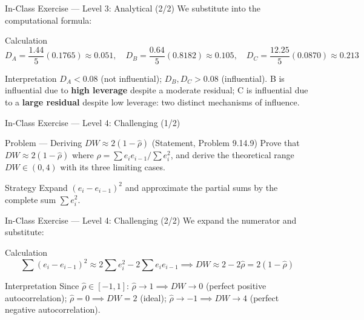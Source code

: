 \documentclass[10pt, aspectratio=169]{beamer}
\begin{document}
\begin{frame}{In-Class Exercise --- Level 3: Analytical (2/2)}
  \scriptsize
  We substitute into the computational formula: \pause

  \vspace{0.05cm}
  \begin{block}{Calculation}
    \scriptsize
    $$D_A=\frac{1.44}{5}(0.1765)\approx0.051, \quad D_B=\frac{0.64}{5}(0.8182)\approx0.105, \quad D_C=\frac{12.25}{5}(0.0870)\approx0.213$$
  \end{block}

  \vspace{0.05cm}
  \pause
  \begin{alertblock}{Interpretation}
    \scriptsize
    $D_A<0.08$ (not influential); $D_B,D_C>0.08$ (influential). B is influential due to \textbf{high leverage} despite a moderate residual; C is influential due to a \textbf{large residual} despite low leverage: two distinct mechanisms of influence.
  \end{alertblock}
\end{frame}

\begin{frame}{In-Class Exercise --- Level 4: Challenging (1/2)}
  \footnotesize
  \begin{block}{Problem --- Deriving $DW\approx2(1-\hat\rho)$ (Statement, Problem 9.14.9)}
    Prove that $DW\approx2(1-\hat\rho)$ where $\hat\rho=\sum e_ie_{i-1}/\sum e_i^2$, and derive the theoretical range $DW\in(0,4)$ with its three limiting cases.
  \end{block}

  \vspace{0.1cm}
  \pause
  \begin{alertblock}{Strategy}
    \scriptsize
    Expand $(e_i-e_{i-1})^2$ and approximate the partial sums by the complete sum $\sum e_i^2$.
  \end{alertblock}
\end{frame}

\begin{frame}{In-Class Exercise --- Level 4: Challenging (2/2)}
  \scriptsize
  We expand the numerator and substitute: \pause

  \vspace{0.05cm}
  \begin{block}{Calculation}
    \scriptsize
    $$\sum(e_i-e_{i-1})^2\approx2\sum e_i^2-2\sum e_ie_{i-1} \implies DW\approx2-2\hat\rho=2(1-\hat\rho)$$
  \end{block}

  \vspace{0.05cm}
  \pause
  \begin{alertblock}{Interpretation}
    \scriptsize
    Since $\hat\rho\in[-1,1]$: $\hat\rho\to1\implies DW\to0$ (perfect positive autocorrelation); $\hat\rho=0\implies DW=2$ (ideal); $\hat\rho\to-1\implies DW\to4$ (perfect negative autocorrelation).
  \end{alertblock}
\end{frame}
\end{document}
